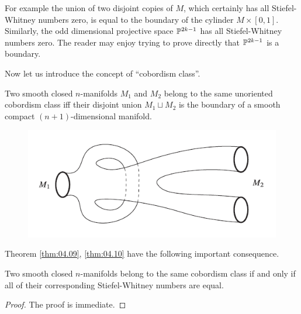 \documentclass[../main]{subfiles}
\begin{document}
For example the union of two disjoint copies of $M$, which certainly
has all Stiefel-Whitney numbers zero, is equal to the boundary of the
cylinder $M\times [0, 1]$. Similarly, the odd dimensional projective space
$\mathbb{P}^{2k-1}$ has all Stiefel-Whitney numbers zero. The reader may enjoy trying
to prove directly that $\mathbb{P}^{2k-1}$ is a boundary.

Now let us introduce the concept of ``cobordism class''.

\begin{definition}\label{def:04.03}
Two smooth closed $n$-manifolds $M_1$ and $M_2$ belong
to the same unoriented cobordism class iff their disjoint union $M_1 \sqcup M_2$
is the boundary of a smooth compact $(n+1)$-dimensional manifold.	
\end{definition}

\begin{figure}[ht]
    \centering
    \includegraphics[scale=0.6]{"../tex from old group/fig6.png"}
    \caption{}
    \label{fig:figure6}
\end{figure}


Theorem \ref{thm:04.09}, \ref{thm:04.10} have the following important consequence.
\begin{corollary}\label{cor:04.11}
Two smooth closed $n$-manifolds belong to
the same cobordism class if and only if all of their corresponding Stiefel-Whitney numbers are equal.	
\end{corollary}
\begin{proof}
The proof is immediate.
\end{proof}
\end{document}
